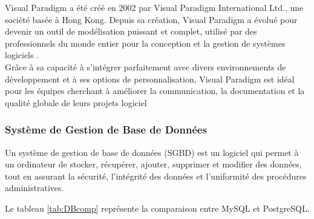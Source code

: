 \documentclass[12pt]{report}
\begin{document}
				Visual Paradigm a été créé en 2002 par Visual Paradigm International Ltd., une société basée à Hong Kong. Depuis sa création, Visual Paradigm a évolué pour devenir un outil de modélisation puissant et complet, utilisé par des professionnels du monde entier pour la conception et la gestion de systèmes logiciels \cite{VisualParadigm}.\\

				Grâce à sa capacité à s'intégrer parfaitement avec divers environnements de développement et à ses options de personnalisation, Visual Paradigm est idéal pour les équipes cherchant à améliorer la communication, la documentation et la qualité globale de leurs projets logiciel

				\subsubsection{Système de Gestion de Base de Données}

				\hspace{15pt} Un système de gestion de base de données (SGBD) est un logiciel qui permet à un ordinateur de stocker, récupérer, ajouter, supprimer et modifier des données, tout en assurant la sécurité, l'intégrité des données et l'uniformité des procédures administratives.


				Le tableau \ref{tab:DBcomp} représente la comparaison entre MySQL et PostgreSQL.
\end{document}
